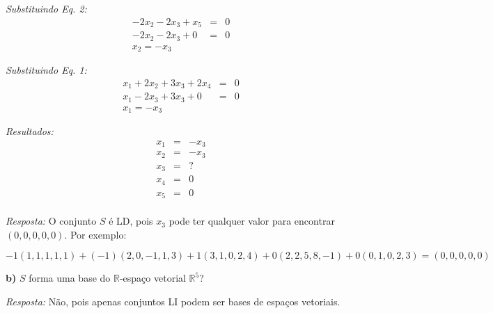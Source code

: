 \documentclass[11pt]{article}
\newenvironment{question}[1]
  {\par\addvspace{\medskipamount}
   \noindent\makebox[0pt][r]{\textbf{#1)} }\ignorespaces}
  {\par\addvspace{\medskipamount}}
\begin{document}
\begin{question}{2}
\textit{Substituindo Eq. 2:}
$$
\begin{array}{rcl}
  -2x_2-2x_3+x_5  &= &0\\
  -2x_2-2x_3+0  &= &0\\
  x_2 = -x_3
\end{array}
$$

\textit{Substituindo Eq. 1:}
$$
\begin{array}{rcl}
  x_1+2x_2+3x_3+2x_4 &= &0\\
  x_1-2x_3+3x_3+0 &= &0\\
  x_1 = -x_3
\end{array}
$$

\textit{Resultados:}
$$
\begin{array}{rcl}
  x_1 &= &-x_3\\
  x_2 &= &-x_3\\
  x_3 &= &?\\
  x_4 &= &0\\
  x_5 &= &0\\
\end{array}
$$

\textit{Resposta:} O conjunto $S$ é LD, pois $x_3$ pode ter qualquer valor para encontrar $(0,0,0,0,0)$. Por exemplo:

$$-1(1,1,1,1,1)+(-1)(2,0,-1,1,3)+1(3,1,0,2,4)+0(2,2,5,8,-1)+0(0,1,0,2,3)=(0,0,0,0,0)$$

\textbf{b)} $S$ forma uma base do $\mathbb{R}$-espaço vetorial $\mathbb{R}^5$?

\textit{Resposta:} Não, pois apenas conjuntos LI podem ser bases de espaços vetoriais.

\end{question}
\end{document}
